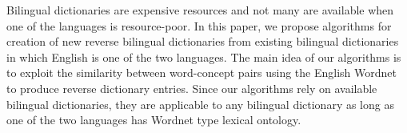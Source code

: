 Bilingual dictionaries are expensive resources and not many are available when one of the languages is resource-poor. In this paper, we propose algorithms for
 creation of new reverse bilingual dictionaries from existing bilingual
 dictionaries in which English is one of the two languages. The main idea of our
 algorithms is to exploit the similarity between word-concept pairs using the
 English Wordnet to produce reverse dictionary entries. Since our algorithms
 rely on available bilingual dictionaries, they are applicable to any bilingual
 dictionary as long as one of the two languages has Wordnet type lexical
 ontology.

